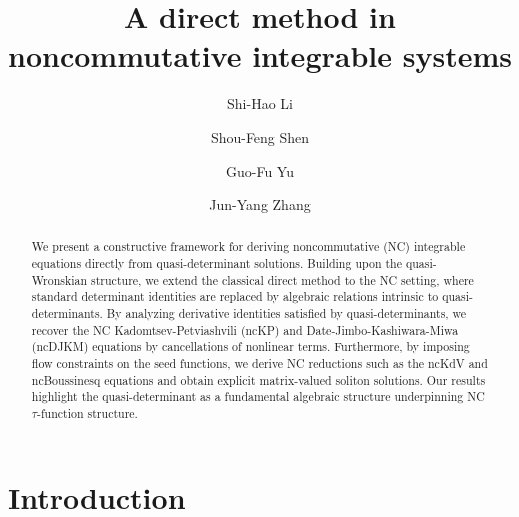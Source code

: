 \documentclass[11p,reqno]{amsart}
\numberwithin{equation}{section}
\numberwithin{equation}{section}
\begin{document}
\title[A direct method in noncommutative integrable systems]{A direct method in noncommutative integrable systems}

\date{}

\dedicatory{}


\author{Shi-Hao Li}
\address{Department of Mathematics, Sichuan University, Chengdu, 610064, PR China}

\author{Shou-Feng Shen}
\address{School of Mathematical Sciences, Zhejiang University of Technology, Hangzhou, 310023, Zhejiang, China}

\author{Guo-Fu Yu}
\address{School of Mathematical Sciences, Shanghai Jiaotong University, People's Republic of China; School of Mathematical Sciences, CMA-Shanghai, Shanghai Jiao Tong University, Shanghai 200240}

\author{Jun-Yang Zhang}
\address{School of Mathematical Sciences, Zhejiang University of Technology, Hangzhou, 310023, Zhejiang, China}


\begin{abstract}
We present a constructive framework for deriving noncommutative (NC) integrable equations directly from quasi-determinant solutions. Building upon the quasi-Wronskian structure, we extend the classical direct method to the NC setting, where standard determinant identities are replaced by algebraic relations intrinsic to quasi-determinants. By analyzing derivative identities satisfied by quasi-determinants, we recover the NC Kadomtsev-Petviashvili (ncKP) and Date-Jimbo-Kashiwara-Miwa (ncDJKM) equations by cancellations of nonlinear terms. Furthermore, by imposing flow constraints on the seed functions, we derive NC reductions such as the ncKdV and ncBoussinesq equations and obtain explicit matrix-valued soliton solutions. Our results highlight the quasi-determinant as a fundamental algebraic structure underpinning NC $\tau$-function structure.

\end{abstract}



\maketitle

\section{Introduction}
\end{document}
